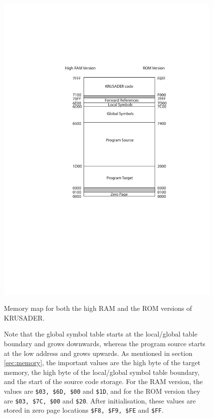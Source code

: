 \documentclass[12pt]{article}
\newcommand{\krusader}{\textsf{KRUSADER}\xspace}
\begin{document}
\begin{figure}[htb]
\centering
\includegraphics[scale=0.85]{Memory.pdf}
\caption{Memory map for both the high RAM and the ROM versions of \krusader.}
\caption*{Note that the global symbol table starts at the local/global table boundary and grows downwards, whereas the 
program source starts at the low address and grows upwards.
As mentioned in section \protect\ref{sec:memory}, the important values are the high byte of the target
memory, the high byte of the local/global symbol table boundary, and the start of the source code storage.  For the RAM version, the values are \texttt{\$03, \$6D, \$00} and \texttt{\$1D}, and for the ROM version
they are \texttt{\$03, \$7C, \$00} and \texttt{\$20}.
After initialisation, these values are stored in zero page locations \texttt{\$F8, \$F9, \$FE} and \texttt{\$FF}.
}
\label{fig:memmap}
\end{figure}
\end{document}
